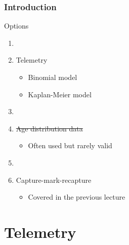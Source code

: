 \documentclass[color=usenames,dvipsnames]{beamer}\usepackage[]{graphicx}\usepackage[]{color}
\begin{document}
\begin{frame}
  \frametitle{Introduction}
  \Large %
  {%
    Options}
  \begin{enumerate}[\bf (1)]
    \large
    \item[]
    \item Telemetry
      \begin{itemize}
        \large
        \item Binomial model
        \item Kaplan-Meier model
      \end{itemize}
    \item[]
    \item<2-> \st{Age distribution data}
      \begin{itemize}
        \item Often used but rarely valid
      \end{itemize}
    \item[]
    \item<3-> Capture-mark-recapture
      \begin{itemize}
        \item Covered in the previous lecture
      \end{itemize}
  \end{enumerate}
\end{frame}




\section{Telemetry}



\end{document}
